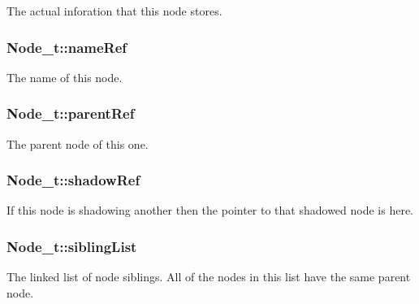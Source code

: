 The actual inforation that this node stores. 

\subsubsection[{\texorpdfstring{name\+Ref}{nameRef}}]{ Node\+\_\+t\+::name\+Ref}\hypertarget{struct_node__t_adf247b01137fd2743c4390e9898e37bd}{}\label{struct_node__t_adf247b01137fd2743c4390e9898e37bd}


The name of this node. 

\subsubsection[{\texorpdfstring{parent\+Ref}{parentRef}}]{ Node\+\_\+t\+::parent\+Ref}\hypertarget{struct_node__t_ac48f1b18479a2a96c50a9e9828449134}{}\label{struct_node__t_ac48f1b18479a2a96c50a9e9828449134}


The parent node of this one. 

\subsubsection[{\texorpdfstring{shadow\+Ref}{shadowRef}}]{ Node\+\_\+t\+::shadow\+Ref}\hypertarget{struct_node__t_a11cafd8692148f205dce7bcfb8487ea5}{}\label{struct_node__t_a11cafd8692148f205dce7bcfb8487ea5}
If this node is shadowing another then the pointer to that shadowed node is here. 
\subsubsection[{\texorpdfstring{sibling\+List}{siblingList}}]{ Node\+\_\+t\+::sibling\+List}\hypertarget{struct_node__t_a04c6c16e4fe15f101ab177f459163957}{}\label{struct_node__t_a04c6c16e4fe15f101ab177f459163957}
The linked list of node siblings. All of the nodes in this list have the same parent node. 
